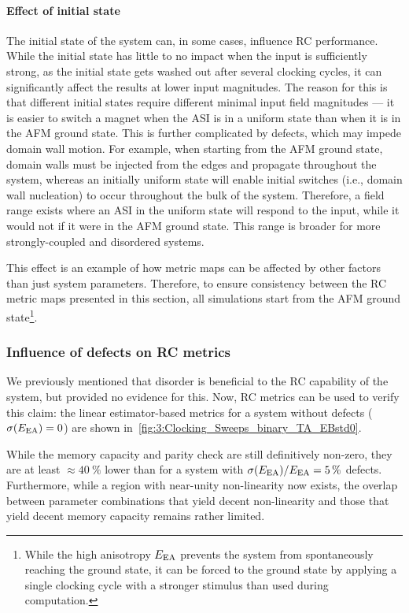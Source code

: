 \paragraph{Effect of initial state}
The initial state of the system can, in some cases, influence RC performance.
While the initial state has little to no impact when the input is sufficiently strong, as the initial state gets washed out after several clocking cycles, it can significantly affect the results at lower input magnitudes.
The reason for this is that different initial states require different minimal input field magnitudes --- it is easier to switch a magnet when the ASI is in a uniform state than when it is in the AFM ground state. %
This is further complicated by defects, which may impede domain wall motion.
For example, when starting from the AFM ground state, domain walls must be injected from the edges and propagate throughout the system, whereas an initially uniform state will enable initial switches (i.e., domain wall nucleation) to occur throughout the bulk of the system.
Therefore, a field range exists where an ASI in the uniform state will respond to the input, while it would not if it were in the AFM ground state.
This range is broader for more strongly-coupled and disordered systems. \par
This effect is an example of how metric maps can be affected by other factors than just system parameters.
Therefore, to ensure consistency between the RC metric maps presented in this section, all simulations start from the AFM ground state\footnote{
	While the high anisotropy $E_\mathrm{EA}$ prevents the system from spontaneously reaching the ground state, it can be forced to the ground state by applying a single clocking cycle with a stronger stimulus than used during computation.
}.

\subsubsection{Influence of defects on RC metrics}
We previously mentioned that disorder is beneficial to the RC capability of the system, but provided no evidence for this.
Now, RC metrics can be used to verify this claim: the linear estimator-based metrics for a system without defects ($\sigma(E_\mathrm{EA}) = 0$) are shown in~\cref{fig:3:Clocking_Sweeps_binary_TA_EBstd0}. \par
While the memory capacity and parity check are still definitively non-zero, they are at least $\approx \SI{40}{\percent}$ lower than for a system with $\sigma(E_\mathrm{EA})/E_\mathrm{EA} = \SI{5}{\percent}$ defects.
Furthermore, while a region with near-unity non-linearity now exists, the overlap between parameter combinations that yield decent non-linearity and those that yield decent memory capacity remains rather limited.

